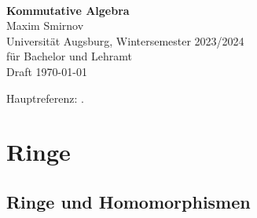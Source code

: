 \documentclass[reqno,12pt]{article}
\numberwithin{equation}{section}
\theoremstyle{plain}
\theoremstyle{definition}
\begin{document}
\thispagestyle{empty}

\
\vspace{100pt}

\begin{center}
{\huge \bf Kommutative Algebra} \\
\vspace{10pt}
{\Large Maxim Smirnov} \\
\vspace{10pt}
{\large Universität Augsburg, Wintersemester 2023/2024 \\
für Bachelor und Lehramt \\
}
\vspace{10pt}
Draft \today
\end{center}



\newpage

{\footnotesize
\setcounter{tocdepth}{2}
\tableofcontents
}



\newpage

Hauptreferenz: \cite{AM}.


\newpage

\section{Ringe}

\subsection{Ringe und Homomorphismen}
\end{document}
